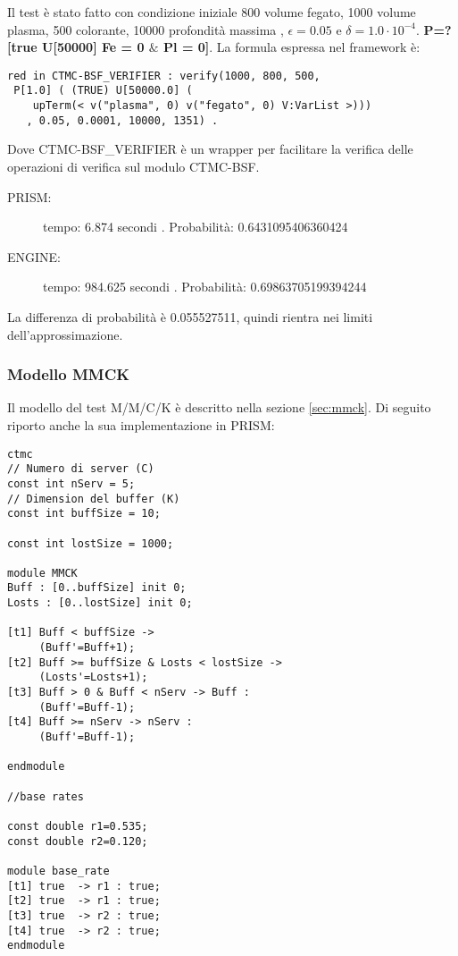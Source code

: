 Il test è stato fatto con condizione iniziale 800 volume fegato, 1000 volume
plasma, 500 colorante, 10000 profondità massima , $\epsilon = 0.05$ e
$\delta = 1.0\cdot10^{-4}$. \textbf{P=?[true U[50000] Fe = 0 $\&$ Pl = 0]}.
La formula espressa nel framework è:
\begin{Verbatim}
red in CTMC-BSF_VERIFIER : verify(1000, 800, 500,
 P[1.0] ( (TRUE) U[50000.0] ( 
    upTerm(< v("plasma", 0) v("fegato", 0) V:VarList >)))
   , 0.05, 0.0001, 10000, 1351) .
\end{Verbatim}
Dove CTMC-BSF\_VERIFIER è un wrapper per facilitare la verifica delle operazioni
di verifica sul modulo CTMC-BSF.

\begin{description}
	\item[PRISM:] tempo: 6.874 secondi . Probabilità: 0.6431095406360424
	\item[ENGINE:] tempo: 984.625 secondi . Probabilità: 0.69863705199394244
\end{description}

La differenza di probabilità è 0.055527511, quindi rientra nei limiti
dell'approssimazione.

\subsubsection{Modello MMCK}

Il modello del test M/M/C/K è descritto nella sezione
\ref{sec:mmck}. Di seguito riporto anche la sua implementazione in PRISM:
\begin{Verbatim}[fontsize=\small]
ctmc
// Numero di server (C)
const int nServ = 5;
// Dimension del buffer (K)
const int buffSize = 10;

const int lostSize = 1000;

module MMCK
Buff : [0..buffSize] init 0;
Losts : [0..lostSize] init 0;

[t1] Buff < buffSize ->
     (Buff'=Buff+1);
[t2] Buff >= buffSize & Losts < lostSize ->
     (Losts'=Losts+1);
[t3] Buff > 0 & Buff < nServ -> Buff :
     (Buff'=Buff-1);
[t4] Buff >= nServ -> nServ : 
     (Buff'=Buff-1);

endmodule

//base rates

const double r1=0.535;
const double r2=0.120;

module base_rate 
[t1] true  -> r1 : true;
[t2] true  -> r1 : true;
[t3] true  -> r2 : true;
[t4] true  -> r2 : true;
endmodule
\end{Verbatim}

